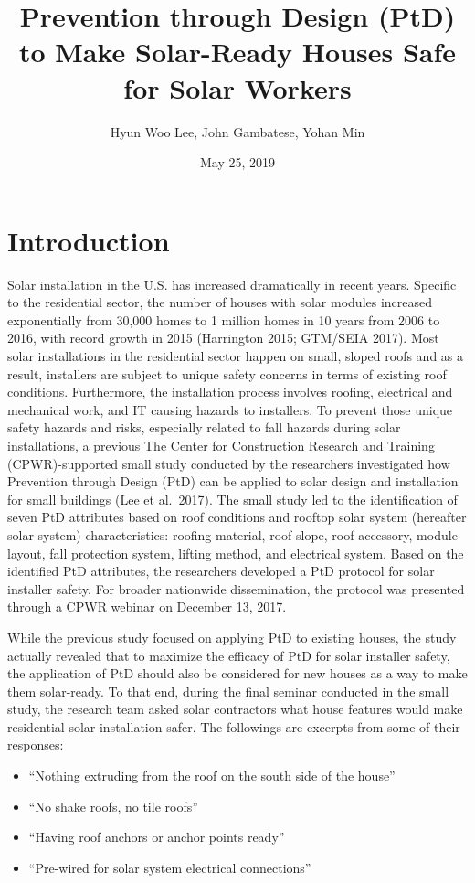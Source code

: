 \documentclass[]{article}
\title{Prevention through Design (PtD) to Make Solar-Ready Houses Safe for
Solar Workers}
\author{Hyun Woo Lee, John Gambatese, Yohan Min}
\date{May 25, 2019}
\providecommand{\tightlist}{%
  \setlength{\itemsep}{0pt}\setlength{\parskip}{0pt}}
\begin{document}
\maketitle

\hypertarget{introduction}{%
\section{Introduction}\label{introduction}}

Solar installation in the U.S. has increased dramatically in recent
years. Specific to the residential sector, the number of houses with
solar modules increased exponentially from 30,000 homes to 1 million
homes in 10 years from 2006 to 2016, with record growth in 2015
(Harrington 2015; GTM/SEIA 2017). Most solar installations in the
residential sector happen on small, sloped roofs and as a result,
installers are subject to unique safety concerns in terms of existing
roof conditions. Furthermore, the installation process involves roofing,
electrical and mechanical work, and IT causing hazards to installers. To
prevent those unique safety hazards and risks, especially related to
fall hazards during solar installations, a previous The Center for
Construction Research and Training (CPWR)-supported small study
conducted by the researchers investigated how Prevention through Design
(PtD) can be applied to solar design and installation for small
buildings (Lee et al.~2017). The small study led to the identification
of seven PtD attributes based on roof conditions and rooftop solar
system (hereafter solar system) characteristics: roofing material, roof
slope, roof accessory, module layout, fall protection system, lifting
method, and electrical system. Based on the identified PtD attributes,
the researchers developed a PtD protocol for solar installer safety. For
broader nationwide dissemination, the protocol was presented through a
CPWR webinar on December 13, 2017.

While the previous study focused on applying PtD to existing houses, the
study actually revealed that to maximize the efficacy of PtD for solar
installer safety, the application of PtD should also be considered for
new houses as a way to make them solar-ready. To that end, during the
final seminar conducted in the small study, the research team asked
solar contractors what house features would make residential solar
installation safer. The followings are excerpts from some of their
responses:

\begin{itemize}
\tightlist
\item
  ``Nothing extruding from the roof on the south side of the house''
\item
  ``No shake roofs, no tile roofs''
\item
  ``Having roof anchors or anchor points ready''
\item
  ``Pre-wired for solar system electrical connections''
\end{itemize}
\end{document}
